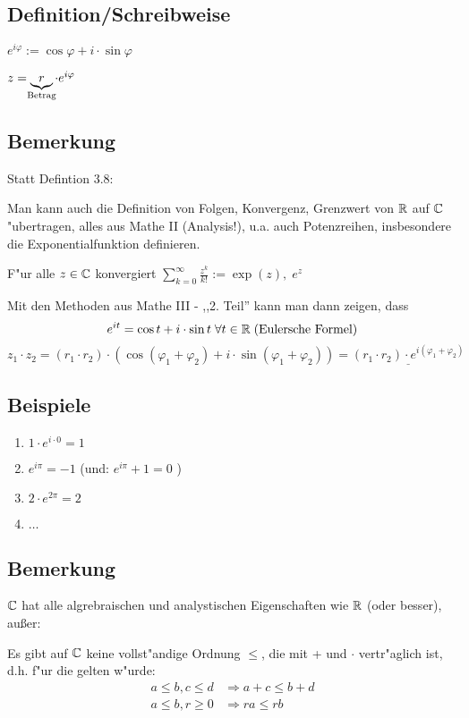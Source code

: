 \subsection{Definition/Schreibweise}

$e^{i\varphi}:= \cos \varphi + i \cdot \sin \varphi$

$z= \underbrace{r}_{\mathclap{\text{Betrag}}} \cdot e^{i\varphi}$

\subsection{Bemerkung}

Statt Defintion 3.8:

Man kann auch die Definition von Folgen, Konvergenz, Grenzwert von $\mathbb{R}$ auf $\mathbb{C}$ "ubertragen, alles aus Mathe II (Analysis!), u.a. auch Potenzreihen, insbesondere die Exponentialfunktion definieren.

F"ur alle $z \in \mathbb{C}$ konvergiert $\sum_{k=0}^{\infty}\frac{z^k}{k!} := \exp(z), \; e^z $

Mit den Methoden aus Mathe III - ,,2. Teil'' kann man dann zeigen, dass \[e ^{it} = \cos t + i \cdot \sin t \; \forall t \in \mathbb{R} \; \text{(Eulersche Formel)}\]
\[z_1\cdot z_2 = (r_1\cdot r_2)\cdot (\cos(\varphi_1 + \varphi_2)+i \cdot \sin (\varphi_1 + \varphi_2)) = \underline{(r_1\cdot r_2) \cdot e^{i (\varphi_1 + \varphi_2)} }\]

\subsection{Beispiele}

\begin{enumerate}
	\item
	$1 \cdot e^{i\cdot 0 } = 1$
	\item
	$e^{i\pi} = -1 $ (und: $e^{i\pi}+1 = 0 $ \smiley)
	\item
	$2 \cdot e^{2\pi} = 2$ 
	\item
	$\ldots$ %
	
\end{enumerate}

\subsection{Bemerkung}

$\mathbb{C}$ hat alle algrebraischen und analystischen Eigenschaften wie $\mathbb{R}$ (oder besser), außer:

Es gibt auf $\mathbb{C}$ keine vollst"andige Ordnung $\leq$, die mit + und $\cdot$ vertr"aglich ist, d.h. f"ur die gelten w"urde:
\begin{align*}
a \leq b, c \leq d&\Rightarrow a+c \leq b+d\\
a \leq b, r \geq 0&\Rightarrow ra \leq rb
\end{align*}